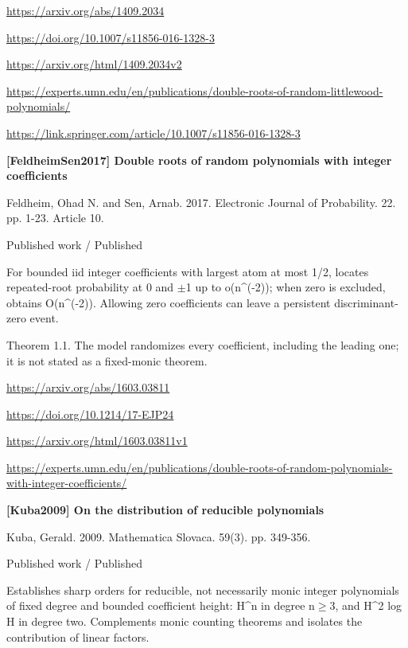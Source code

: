 \documentclass[11pt,a4paper,oneside,openany]{book}
\begin{document}
{\footnotesize\url{https://arxiv.org/abs/1409.2034}}\par
{\footnotesize\url{https://doi.org/10.1007/s11856-016-1328-3}}\par
{\footnotesize\url{https://arxiv.org/html/1409.2034v2}}\par
{\footnotesize\url{https://experts.umn.edu/en/publications/double-roots-of-random-littlewood-polynomials/}}\par
{\footnotesize\url{https://link.springer.com/article/10.1007/s11856-016-1328-3}}\par
\vspace{9pt}
\hypertarget{ref:FeldheimSen2017}{}
{\sffamily\bfseries\color{atlasgreen}[FeldheimSen2017] Double roots of random polynomials with integer coefficients}\par
\color{black} Feldheim, Ohad N. and Sen, Arnab. 2017. Electronic Journal of Probability. 22. pp. 1-23. Article 10.\par
{\small\sffamily\color{atlasgold}Published work / Published}\par
\color{black} For bounded iid integer coefficients with largest atom at most 1/2, locates repeated-root probability at 0 and \ensuremath{\pm}1 up to o(n\textasciicircum{}(-2)); when zero is excluded, obtains O(n\textasciicircum{}(-2)). Allowing zero coefficients can leave a persistent discriminant-zero event.\par
{\small Theorem 1.1. The model randomizes every coefficient, including the leading one; it is not stated as a fixed-monic theorem.}\par
{\footnotesize\url{https://arxiv.org/abs/1603.03811}}\par
{\footnotesize\url{https://doi.org/10.1214/17-EJP24}}\par
{\footnotesize\url{https://arxiv.org/html/1603.03811v1}}\par
{\footnotesize\url{https://experts.umn.edu/en/publications/double-roots-of-random-polynomials-with-integer-coefficients/}}\par
\vspace{9pt}
\hypertarget{ref:Kuba2009}{}
{\sffamily\bfseries\color{atlasgreen}[Kuba2009] On the distribution of reducible polynomials}\par
\color{black} Kuba, Gerald. 2009. Mathematica Slovaca. 59(3). pp. 349-356.\par
{\small\sffamily\color{atlasgold}Published work / Published}\par
\color{black} Establishes sharp orders for reducible, not necessarily monic integer polynomials of fixed degree and bounded coefficient height: H\textasciicircum{}n in degree n\ensuremath{\ge}3, and H\textasciicircum{}2 log H in degree two. Complements monic counting theorems and isolates the contribution of linear factors.\par
\end{document}
